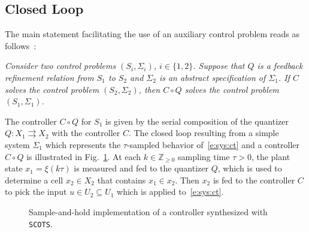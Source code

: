 \documentclass[a4paper]{amsart}
\newcommand{\segcc}[1]{\ensuremath{{\left\llbracket#1\right\rrbracket}}}
\newcommand{\Z}{\mathbb{Z}}
\begin{document}
\subsection{Closed Loop} The main statement facilitating the use of an auxiliary
control problem reads as follows~\cite[Thm.~VI.3]{ReissigWeberRungger15}:

\emph{Consider two control problems $(S_i,\Sigma_i)$, $i\in\{1,2\}$. Suppose that $Q$
is a feedback refinement relation from $S_1$ to $S_2$ and $\Sigma_2$ is an
abstract specification of $\Sigma_1$. If $C$ solves the control problem $(S_2,\Sigma_2)$, then $C\circ
Q$ solves the control problem $(S_1,\Sigma_1)$.}

The controller $C\circ Q$ for $S_1$ is given by the serial composition of the quantizer
$Q:X_1\rightrightarrows X_2$ with the controller $C$. 
The closed loop resulting from a simple system $\Sigma_1$ which represents the $\tau$-sampled
behavior of~\eqref{e:sys:ct} and a controller $C\circ Q$ is illustrated
in Fig.~\ref{f:closedloop}. At each $k\in\Z_{\ge0}$ sampling
time $\tau>0$, the plant state $x_1=\xi(k\tau)$ is measured and fed to the
quantizer $Q$, which is used to determine a cell $x_2\in X_2$ that contains
$x_1\in x_2$. Then $x_2$ is fed to the controller $C$ to pick the input $u\in
U_2\subseteq U_1$ which is applied to~\eqref{e:sys:ct}.
\begin{figure}[h]
  \centering
\caption{Sample-and-hold implementation of a controller synthesized with {\tt SCOTS}.}\label{f:closedloop}
\end{figure}
\end{document}
